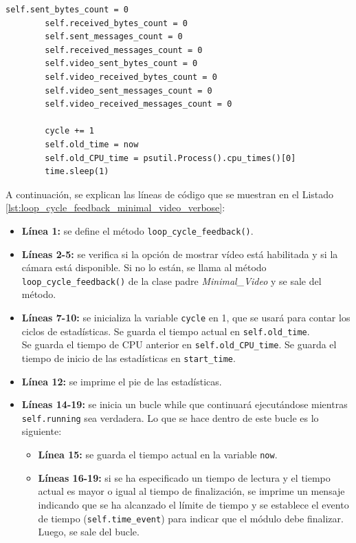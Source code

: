 \begin{lstlisting}[style=pythonstyle, caption={Método \texttt{loop\_cycle\_feedback()} de \textit{Minimal\_Video\_verbose}.}, label={lst:loop_cycle_feedback_minimal_video_verbose}]
        self.sent_bytes_count = 0
        self.received_bytes_count = 0
        self.sent_messages_count = 0
        self.received_messages_count = 0
        self.video_sent_bytes_count = 0
        self.video_received_bytes_count = 0
        self.video_sent_messages_count = 0
        self.video_received_messages_count = 0

        cycle += 1
        self.old_time = now
        self.old_CPU_time = psutil.Process().cpu_times()[0]
        time.sleep(1)
\end{lstlisting}
\vspace{\baselineskip}

A continuación, se explican las líneas de código que se muestran en el Listado \ref{lst:loop_cycle_feedback_minimal_video_verbose}:

\begin{itemize}
    \item \textbf{Línea 1:} se define el método \texttt{loop\_cycle\_feedback()}.
    \item \textbf{Líneas 2-5:} se verifica si la opción de mostrar vídeo está habilitada y si la cámara está disponible. Si no lo están, se llama al método \texttt{loop\_cycle\_feedback()} de la clase padre \textit{Minimal\_Video} y se sale del método.
    \item \textbf{Líneas 7-10:} se inicializa la variable \texttt{cycle} en 1, que se usará para contar los ciclos de estadísticas. Se guarda el tiempo actual en \texttt{self.old\_time}. \\
    Se guarda el tiempo de CPU anterior en \texttt{self.old\_CPU\_time}. Se guarda el tiempo de inicio de las estadísticas en \texttt{start\_time}.
    \item \textbf{Línea 12:} se imprime el pie de las estadísticas.
    \item \textbf{Líneas 14-19:} se inicia un bucle while que continuará ejecutándose mientras \texttt{self.running} sea verdadera. Lo que se hace dentro de este bucle es lo siguiente:
    \begin{itemize}
        \item \textbf{Línea 15:} se guarda el tiempo actual en la variable \texttt{now}.
        \item \textbf{Líneas 16-19:} si se ha especificado un tiempo de lectura y el tiempo actual es mayor o igual al tiempo de finalización, se imprime un mensaje indicando que se ha alcanzado el límite de tiempo y se establece el evento de tiempo (\texttt{self.time\_event}) para indicar que el módulo debe finalizar. Luego, se sale del bucle.

\end{itemize}
\end{itemize}
